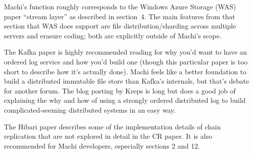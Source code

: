 \documentclass[preprint,10pt]{sigplanconf}
\begin{document}
 Machi's function
roughly corresponds to the Windows Azure Storage (WAS) paper \cite{was}
``stream layer'' as described in section~4.
The main features from that section that WAS does support are file
distribution/sharding across multiple servers and erasure coding; both
are explicitly outside of Machi's scope.

The Kafka paper \cite{kafka} is highly recommended reading for why
you'd want to have an ordered log service and how you'd build one
(though this particular paper is too short to describe how it's
actually done).
Machi feels like a better foundation to build a
distributed immutable file store than Kafka's internals, but
that's debate for another forum.  The blog posting by Kreps
\cite{the-log-what} is long but does a good job of explaining
the why and how of using a strongly ordered distributed log to build
complicated-seeming distributed systems in an easy way.

The Hibari paper \cite{cr-theory-and-practice} describes some of the
implementation details of chain replication that are not explored in
detail in the CR paper.  It is also recommended for Machi developers,
especially sections 2 and 12.
\end{document}
